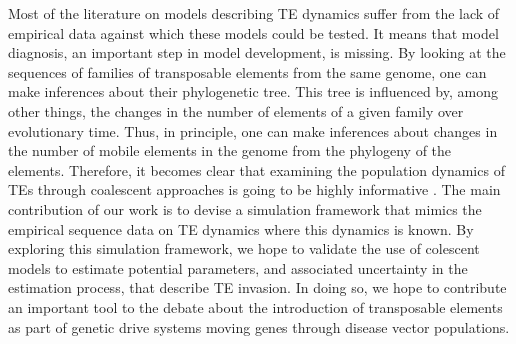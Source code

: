\documentclass{bioinfo}
\begin{document}
Most of the literature on models describing TE dynamics suffer from
the lack of empirical data against which these models could be
tested. It means that model diagnosis, an important step in model
development, is missing. By looking at the sequences of families of
transposable elements from the same genome, one can make inferences
about their phylogenetic tree. This tree is influenced by, among other
things, the changes in the number of elements of a given family over
evolutionary time. Thus, in principle, one can make inferences about
changes in the number of mobile elements in the genome from the
phylogeny of the elements. Therefore, it becomes clear that examining
the population dynamics of TEs through coalescent approaches is going
to be highly informative \citep{Bro05,BJ06,SMT+09}. The main
contribution of our work is to devise a simulation framework that
mimics the empirical sequence data on TE dynamics where this dynamics
is known. By exploring this simulation framework, we hope to validate
the use of colescent models to estimate potential parameters, and
associated uncertainty in the estimation process, that describe TE
invasion. In doing so, we hope to contribute an important tool to the
debate about the introduction of transposable elements as part of
genetic drive systems moving genes through disease vector populations.

\end{document}
